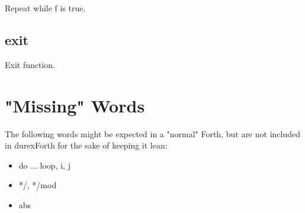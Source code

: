 Repeat while f is true.

\subsection{exit}

Exit function.


\section{"Missing" Words}

The following words might be expected in a "normal" Forth, but are not included in durexForth for the sake of keeping it lean:

\begin{itemize}
\item do ... loop, i, j
\item */, */mod
\item abs
\end{itemize}
